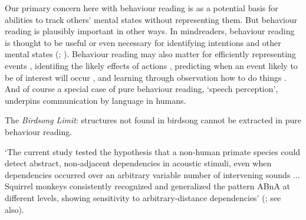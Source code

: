 \documentclass[12pt]{extarticle}
\begin{document}
\begin{multicols*}{3}
Our primary concern here with behaviour reading is as a potential basis for abilities to track others’ mental states without representing them.
But behaviour reading is plausibly important in other ways.
In mindreaders, behaviour reading is thought to be useful or even necessary for identifying intentions and other mental states (\citealp[p.~861]{Newtson:1977dw}; \citealp[p.~708]{Baldwin:2001rn}).
Behaviour reading may also matter for efficiently representing events \citep{Kurby:2008bk}, identifing the likely effects of actions \citep{Byrne:1999jk}, predicting when an event likely to be of interest will occur \citep[p.~121]{Swallow:2008cf},
and learning through observation how to do things \citep{Byrne:2003wx}.
And of course a special case of pure behaviour reading, ‘speech perception’, underpins communication by language in humans.

The \emph{Birdsong Limit}: structures not found in birdsong cannot be extracted in pure behaviour reading.

‘The current study tested the hypothesis that a non-human primate species could detect abstract,
non-adjacent dependencies in acoustic stimuli, even when dependencies occurred over an arbitrary
variable number of intervening sounds ... Squirrel monkeys consistently recognized and generalized
the pattern ABnA at different levels, showing sensitivity to arbitrary-distance dependencies’
(\citealp{ravignani:2013_action}; see also\citealp{sonnweber:2015_non}).







\footnotesize


\end{multicols*}
\end{document}

